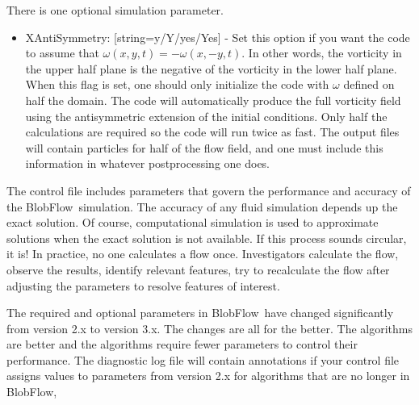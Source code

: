 \documentclass[12pt]{report}
\newcommand{\BF}{BlobFlow}
\begin{document}
There is one optional simulation parameter.

\begin{itemize}

\item XAntiSymmetry: [string=y/Y/yes/Yes] - Set this option if you want the code
to assume that $\omega(x,y,t) = -\omega(x,-y,t)$.  In other words, the vorticity
in the upper half plane is the
negative of the vorticity in the lower half plane.  When this flag is set, one
should only initialize the code with
$\omega$ defined on half the domain.  The code will automatically produce the
full vorticity field using the antisymmetric extension of the initial
conditions.  Only half the
calculations are
required so the code will run twice as fast.  The output files will
contain particles for half of the flow field, and one must include this
information in whatever postprocessing one does.  

\end{itemize}

The control file includes parameters that govern the performance and
accuracy of the \BF~simulation.  The
accuracy of any fluid simulation depends up the exact solution.  Of course,
computational simulation is used to approximate solutions when the exact
solution is not available.  If this
process sounds circular, it is!  In practice, no one calculates a flow
once.  Investigators calculate the flow, observe the results, identify
relevant features, try to recalculate the flow after adjusting the parameters to
resolve features of interest.  

The required and optional parameters in \BF~have changed significantly from
version 2.x to version 3.x.  The changes are all for the better.  The algorithms
are better and the algorithms require fewer parameters to control their
performance.  The diagnostic log file will contain annotations if your control
file assigns values to parameters from version 2.x for algorithms that are no
longer in \BF,
\end{document}
